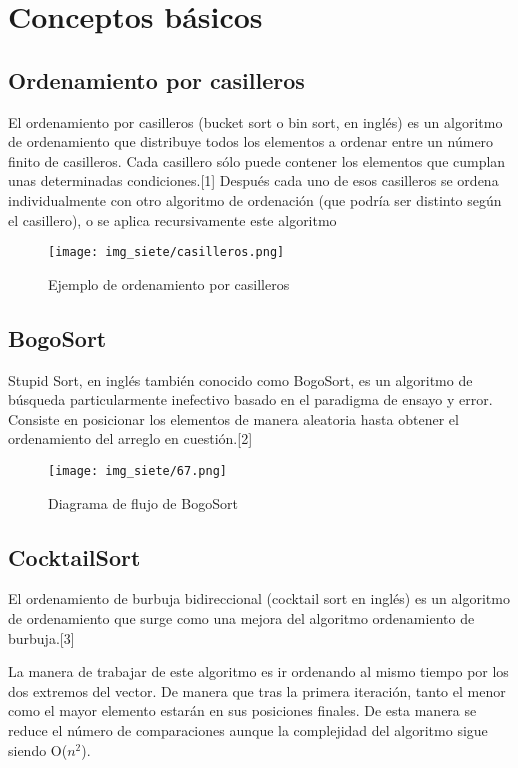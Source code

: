 \documentclass[12pt,twoside]{article}
\begin{document}
\section{Conceptos básicos}
\subsection*{Ordenamiento por casilleros}
El ordenamiento por casilleros (bucket sort o bin sort, en inglés) es un algoritmo de ordenamiento que distribuye todos los elementos a ordenar entre un número finito de casilleros. Cada casillero sólo puede contener los elementos que cumplan unas determinadas condiciones.[1]
\newline
\newline
Después cada uno de esos casilleros se ordena individualmente con otro algoritmo de ordenación (que podría ser distinto según el casillero), o se aplica recursivamente este algoritmo
\newline
\begin{figure}[H]
\centering
\texttt{[image: img\_siete/casilleros.png]}
    \caption{Ejemplo de ordenamiento por casilleros}
\end{figure}
\vspace{10 mm}
\subsection*{BogoSort}
Stupid Sort, en inglés también conocido como BogoSort, es un algoritmo de búsqueda particularmente inefectivo basado en el paradigma de ensayo y error.
\newline
Consiste en posicionar los elementos de manera aleatoria hasta obtener el ordenamiento del arreglo en cuestión.[2]
\vspace{10 mm}
\begin{figure}[H]
\centering
\texttt{[image: img\_siete/67.png]}
\caption{Diagrama de flujo de BogoSort}
\end{figure}
\subsection{CocktailSort}
El ordenamiento de burbuja bidireccional (cocktail sort en inglés) es un algoritmo de ordenamiento que surge como una mejora del algoritmo ordenamiento de burbuja.[3]

La manera de trabajar de este algoritmo es ir ordenando al mismo tiempo por los dos extremos del vector. De manera que tras la primera iteración, tanto el menor como el mayor elemento estarán en sus posiciones finales. De esta manera se reduce el número de comparaciones aunque la complejidad del algoritmo sigue siendo O($n^2$).
\end{document}
